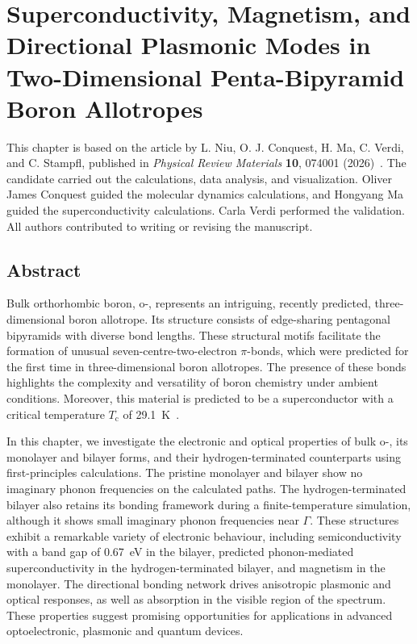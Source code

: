 \chapter[Functional Properties of Penta-Bipyramid Boron Phases]{Superconductivity, Magnetism, and Directional Plasmonic Modes in Two-Dimensional Penta-Bipyramid Boron Allotropes}
\label{cha:project_boron}

This chapter is based on the article by L. Niu, O. J. Conquest, H. Ma, C. Verdi, and C. Stampfl,
published in \textit{Physical Review Materials} \textbf{10}, 074001 (2026)~\cite{niu2026superconductivity}.
The candidate carried out the calculations, data analysis, and visualization.
Oliver James Conquest guided the molecular dynamics calculations,
and Hongyang Ma guided the superconductivity calculations.
Carla Verdi performed the validation.
All authors contributed to writing or revising the manuscript.

\section{Abstract}
\label{2_abstract}

Bulk orthorhombic boron, o-, represents an intriguing, recently predicted,
three-dimensional boron allotrope.
Its structure consists of edge-sharing pentagonal bipyramids
with diverse bond lengths.
These structural motifs facilitate the formation of unusual seven-centre-two-electron $\pi$-bonds,
which were predicted for the first time in three-dimensional boron allotropes.
The presence of these bonds highlights the complexity and versatility of boron chemistry under ambient conditions.
Moreover, this material is predicted to be a superconductor with a critical temperature $T_\mathrm{c}$ of \qty{29.1}{K}~\cite{han2023superconducting}.

In this chapter, we investigate the electronic and optical properties of bulk o-,
its monolayer and bilayer forms,
and their hydrogen-terminated counterparts using first-principles calculations.
The pristine monolayer and bilayer show no imaginary phonon frequencies on the calculated paths.
The hydrogen-terminated bilayer also retains its bonding framework during a finite-temperature simulation,
although it shows small imaginary phonon frequencies near $\Gamma$.
These structures exhibit a remarkable variety of electronic behaviour,
including semiconductivity with a band gap of \qty{0.67}{\electronvolt} in the bilayer,
predicted phonon-mediated superconductivity in the hydrogen-terminated bilayer,
and magnetism in the monolayer.
The directional bonding network drives anisotropic plasmonic and optical responses,
as well as absorption in the visible region of the spectrum.
These properties suggest promising opportunities for applications in advanced optoelectronic, plasmonic and quantum devices.

